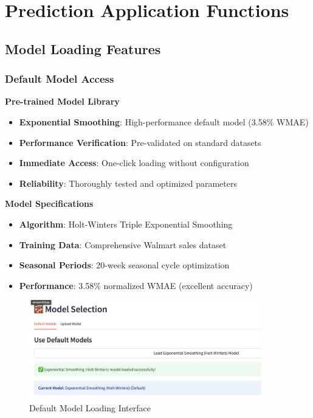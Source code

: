 \section{Prediction Application Functions}

\subsection{Model Loading Features}

\subsubsection{Default Model Access}

\textbf{Pre-trained Model Library}
\begin{itemize}
	\item \textbf{Exponential Smoothing}: High-performance default model (3.58\% WMAE)
	\item \textbf{Performance Verification}: Pre-validated on standard datasets
	\item \textbf{Immediate Access}: One-click loading without configuration
	\item \textbf{Reliability}: Thoroughly tested and optimized parameters
\end{itemize}

\textbf{Model Specifications}
\begin{itemize}
	\item \textbf{Algorithm}: Holt-Winters Triple Exponential Smoothing
	\item \textbf{Training Data}: Comprehensive Walmart sales dataset
	\item \textbf{Seasonal Periods}: 20-week seasonal cycle optimization
	\item \textbf{Performance}: 3.58\% normalized WMAE (excellent accuracy)
\end{itemize}

\begin{figure}[H]
	\centering
	\includegraphics[width=0.9\textwidth]{Images/05ApplicationFunctionsAndFeatures/DefaultModelLoading.png}
	\caption{Default Model Loading Interface}
	\label{fig:default_model_loading}
\end{figure}

